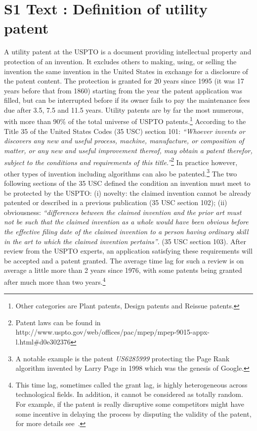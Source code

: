 



\section*{S1 Text : Definition of utility patent} 

A utility patent at the USPTO is a document providing intellectual property and protection of an invention. It excludes others to making, using, or selling the invention the same invention in the United States in exchange for a disclosure of the patent content. The protection is granted for 20 years since 1995 (it was 17 years before that from 1860) starting from the year the patent application was filled, but can be interrupted before if its owner fails to pay the maintenance fees due after 3.5, 7.5 and 11.5 years. Utility patents are by far the most numerous, with more than 90\% of the total universe of USPTO patents.\footnote{Other categories are Plant patents, Design patents and Reissue patents.} According to the Title 35 of the United States Codes (35 USC) section 101: \textit{``Whoever invents or discovers any new and useful process, machine, manufacture, or composition of matter, or any new and useful improvement thereof, may obtain a patent therefor, subject to the conditions and requirements of this title.''}\footnote{%
Patent laws can be found in http://www.uspto.gov/web/offices/pac/mpep/mpep-9015-appx-l.html\#d0e302376} In practice however, other types of invention including algorithms can also be patented.\footnote{A notable example is the patent \textit{US6285999} protecting the Page Rank algorithm invented by Larry Page in 1998 which was the genesis of Google.} The two following sections of the 35 USC defined the condition an invention must meet to be protected by the USPTO: (i) novelty: the claimed invention cannot be already patented or described in a previous publication (35 USC section 102); (ii) obviousness: \textit{``differences between the claimed invention and the prior art must not be such that the claimed invention as a whole would have been obvious before the effective filing date of the claimed invention to a person having ordinary skill in the art to which the claimed invention pertains''}. (35 USC section 103). After review from the USPTO experts, an application satisfying these requirements will be accepted and a patent granted. The average time lag for such a review is on average a little more than 2 years since 1976, with some patents being granted after much more than two years.\footnote{This time lag, sometimes called the grant lag, is highly heterogeneous across technological fields. In addition, it cannot be considered as totally random. For example, if the patent is really disruptive some competitors might have some incentive in delaying the process by disputing the validity of the patent, for more details see~\cite{regibeau2010}.}


